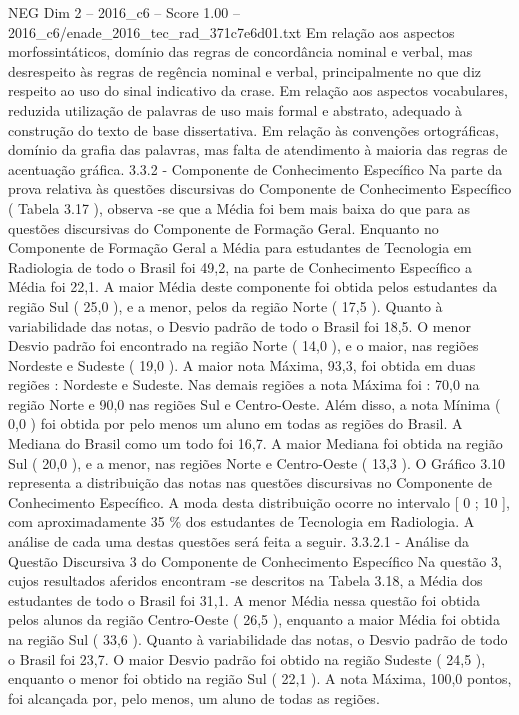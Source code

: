 \begin{textsample}{NEG Dim 2 – 2016\_c6 – Score 1.00 – 2016\_c6/enade\_2016\_tec\_rad\_371c7e6d01.txt}
Em relação aos aspectos morfossintáticos, domínio das regras de concordância nominal e verbal, mas desrespeito às regras de regência nominal e verbal, principalmente no que diz respeito ao uso do sinal indicativo da crase.
Em relação aos aspectos vocabulares, reduzida utilização de palavras de uso mais formal e abstrato, adequado à construção do texto de base dissertativa.
Em relação às convenções ortográficas, domínio da grafia das palavras, mas falta de atendimento à maioria das regras de acentuação gráfica. 3.3.2 - Componente de Conhecimento Específico Na parte da prova relativa às questões discursivas do Componente de Conhecimento Específico ( Tabela 3.17 ), observa -se que a Média foi bem mais baixa do que para as questões discursivas do Componente de Formação Geral.
Enquanto no Componente de Formação Geral a Média para estudantes de Tecnologia em Radiologia de todo o Brasil foi 49,2, na parte de Conhecimento Específico a Média foi 22,1.
A maior Média deste componente foi obtida pelos estudantes da região Sul ( 25,0 ), e a menor, pelos da região Norte ( 17,5 ).
Quanto à variabilidade das notas, o Desvio padrão de todo o Brasil foi 18,5.
O menor Desvio padrão foi encontrado na região Norte ( 14,0 ), e o maior, nas regiões Nordeste e Sudeste ( 19,0 ).
A maior nota Máxima, 93,3, foi obtida em duas regiões : Nordeste e Sudeste.
Nas demais regiões a nota Máxima foi : 70,0 na região Norte e 90,0 nas regiões Sul e Centro-Oeste.
Além disso, a nota Mínima ( 0,0 ) foi obtida por pelo menos um aluno em todas as regiões do Brasil.
A Mediana do Brasil como um todo foi 16,7.
A maior Mediana foi obtida na região Sul ( 20,0 ), e a menor, nas regiões Norte e Centro-Oeste ( 13,3 ).
O Gráfico 3.10 representa a distribuição das notas nas questões discursivas no Componente de Conhecimento Específico.
A moda desta distribuição ocorre no intervalo [ 0 ; 10 ], com aproximadamente 35 \% dos estudantes de Tecnologia em Radiologia.
A análise de cada uma destas questões será feita a seguir. 3.3.2.1 - Análise da Questão Discursiva 3 do Componente de Conhecimento Específico Na questão 3, cujos resultados aferidos encontram -se descritos na Tabela 3.18, a Média dos estudantes de todo o Brasil foi 31,1.
A menor Média nessa questão foi obtida pelos alunos da região Centro-Oeste ( 26,5 ), enquanto a maior Média foi obtida na região Sul ( 33,6 ).
Quanto à variabilidade das notas, o Desvio padrão de todo o Brasil foi 23,7.
O maior Desvio padrão foi obtido na região Sudeste ( 24,5 ), enquanto o menor foi obtido na região Sul ( 22,1 ).
A nota Máxima, 100,0 pontos, foi alcançada por, pelo menos, um aluno de todas as regiões.

\end{textsample}

